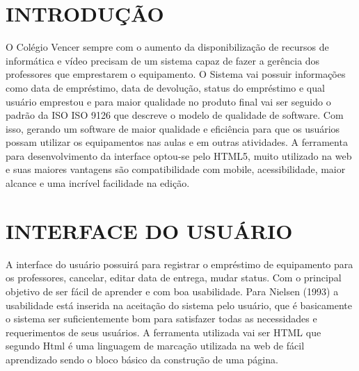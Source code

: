 \documentclass[
12pt,				%
oneside,			%
a4paper,			%
section=TITLE,
brazil,				%
]{abntex2}
\let\oldsection\section
\renewcommand\section{\clearpage\oldsection}
\begin{document}
  \tableofcontents*
  \cleardoublepage
  \textual


  \pagestyle{simple}



  \section{INTRODUÇÃO}

  O Colégio Vencer sempre com o aumento da disponibilização de recursos de
  informática e vídeo precisam de um sistema capaz de fazer a gerência dos
  professores que emprestarem o equipamento. O Sistema vai possuir informações
  como data de empréstimo, data de devolução, status do empréstimo e qual usuário
  emprestou e para maior qualidade no produto final vai ser seguido o padrão da
  ISO ISO 9126 que descreve o modelo de qualidade de software. Com isso, gerando
  um software de maior qualidade e eficiência para que os usuários  possam
  utilizar os equipamentos nas  aulas e em outras atividades. A ferramenta para
  desenvolvimento da interface optou-se pelo HTML5, muito utilizado na web e suas
  maiores vantagens são compatibilidade com mobile, acessibilidade, maior alcance
  e uma incrível facilidade na edição.


  \section{INTERFACE DO USUÁRIO}

  A interface do usuário possuirá para registrar o empréstimo de equipamento para
  os professores, cancelar, editar data de entrega, mudar status. Com o principal
  objetivo de ser fácil de aprender e com boa usabilidade.  Para Nielsen (1993) a
  usabilidade está inserida na aceitação do sistema pelo usuário, que é
  basicamente o sistema ser suficientemente bom para satisfazer todas as
  necessidades e requerimentos de seus usuários.  A ferramenta utilizada vai ser
  HTML que segundo \cite[p.11]{prescott2015html} Html é uma linguagem de marcação utilizada na
  web de fácil aprendizado sendo o bloco básico da construção de uma página.
\end{document}
